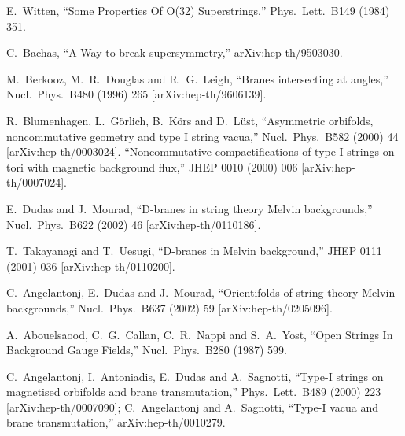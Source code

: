 \documentclass[a4paper,12pt]{article}
\begin{document}
\begin{thebibliography}{77}

 E.~Witten,
``Some Properties Of O(32) Superstrings,''
Phys.\ Lett.\ B149 (1984) 351.

 C.~Bachas,
``A Way to break supersymmetry,''
arXiv:hep-th/9503030.

 M.~Berkooz, M.~R.~Douglas and R.~G.~Leigh,
``Branes intersecting at angles,''
Nucl.\ Phys.\ B480 (1996) 265
[arXiv:hep-th/9606139].

 R.~Blumenhagen, L.~G\"orlich, B.~K\"ors and D.~L\"ust,
``Asymmetric orbifolds, noncommutative geometry and type I string vacua,''
Nucl.\ Phys.\ B582 (2000) 44
[arXiv:hep-th/0003024].
``Noncommutative compactifications of type I strings on tori with  
magnetic background flux,''
JHEP 0010 (2000) 006
[arXiv:hep-th/0007024].

 E.~Dudas and J.~Mourad,
``D-branes in string theory Melvin backgrounds,''
Nucl.\ Phys.\ B622 (2002) 46
[arXiv:hep-th/0110186].

 T.~Takayanagi and T.~Uesugi,
``D-branes in Melvin background,''
JHEP 0111 (2001) 036
[arXiv:hep-th/0110200].

 C.~Angelantonj, E.~Dudas and J.~Mourad,
``Orientifolds of string theory Melvin backgrounds,''
Nucl.\ Phys.\ B637 (2002) 59
[arXiv:hep-th/0205096].

A.~Abouelsaood, C.~G.~Callan, C.~R.~Nappi and S.~A.~Yost,
``Open Strings In Background Gauge Fields,''
Nucl.\ Phys.\ B280 (1987) 599.

 C.~Angelantonj, I.~Antoniadis, E.~Dudas and A.~Sagnotti,
``Type-I strings on magnetised orbifolds and brane transmutation,''
Phys.\ Lett.\ B489 (2000) 223
[arXiv:hep-th/0007090];
C.~Angelantonj and A.~Sagnotti,
``Type-I vacua and brane transmutation,''
arXiv:hep-th/0010279.


\end{thebibliography}
\end{document}
